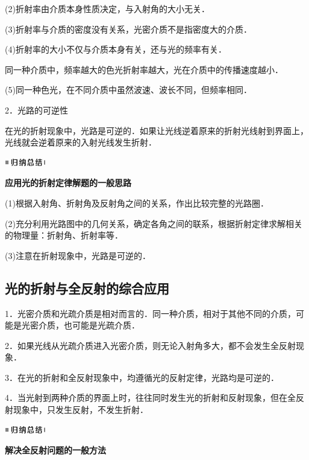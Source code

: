 (2)折射率由介质本身性质决定，与入射角的大小无关．

(3)折射率与介质的密度没有关系，光密介质不是指密度大的介质．

(4)折射率的大小不仅与介质本身有关，还与光的频率有关．

同一种介质中，频率越大的色光折射率越大，光在介质中的传播速度越小．

(5)同一种色光，在不同介质中虽然波速、波长不同，但频率相同．

2．光路的可逆性

在光的折射现象中，光路是可逆的．如果让光线逆着原来的折射光线射到界面上，光线就会逆着原来的入射光线发生折射．

\begin{center}\includegraphics[width=0.70764in,height=0.12292in]{media/image13.png}\end{center}
\begin{center}
  \textbf{应用光的折射定律解题的一般思路}
\end{center}

(1)根据入射角、折射角及反射角之间的关系，作出比较完整的光路圈．

(2)充分利用光路图中的几何关系，确定各角之间的联系，根据折射定律求解相关的物理量：折射角、折射率等．

(3)注意在折射现象中，光路是可逆的．

\subsection{光的折射与全反射的综合应用}

1．光密介质和光疏介质是相对而言的．同一种介质，相对于其他不同的介质，可能是光密介质，也可能是光疏介质．

2．如果光线从光疏介质进入光密介质，则无论入射角多大，都不会发生全反射现象．

3．在光的折射和全反射现象中，均遵循光的反射定律，光路均是可逆的．

4．当光射到两种介质的界面上时，往往同时发生光的折射和反射现象，但在全反射现象中，只发生反射，不发生折射．

\begin{center}\includegraphics[width=0.70764in,height=0.12292in]{media/image13.png}\end{center}
\begin{center}
  \textbf{解决全反射问题的一般方法}
\end{center}

